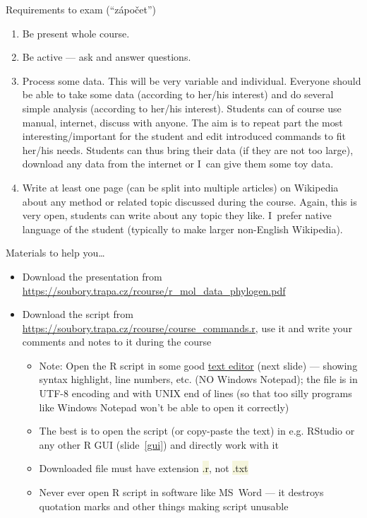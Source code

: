 \documentclass[compress, ucs, xelatex, 11pt, xcolor=svgnames, aspectratio=169,
	hyperref={
		bookmarks=true,
		unicode=true,
		colorlinks=true,
		pdftitle={Molecular data in R},
		plainpages=false,
		pdfauthor={Vojtech Zeisek},
		pdfsubject={Course about phylogeny and evolution in R},
		pdfcreator={XeLaTeX},
		pdfkeywords={R, evolution, phylogeny, molecular data},
		linkcolor=Crimson, %
		anchorcolor=Magenta, %
		citecolor=Magenta, %
		filecolor=Magenta, %
		menucolor=Magenta, %
		urlcolor=DodgerBlue, %
		pdftex},
	url={hyphens, lowtilde} %
	]{beamer}
\renewcommand{\texttt}[1]{\colorbox{Beige}{{\ttfamily #1}}}
\begin{document}
\begin{frame}{Requirements to exam (\enquote{zápočet})}
	\begin{enumerate}
		\item Be present whole course.
		\item Be active --- ask and answer questions.
		\item Process some data. This will be very variable and individual. Everyone should be able to take some data (according to her/his interest) and do several simple analysis (according to her/his interest). Students can of course use manual, internet, discuss with anyone. The aim is to repeat part the most interesting/important for the student and edit introduced commands to fit her/his needs. Students can thus bring their data (if they are not too large), download any data from the internet or I~can give them some toy data.
		\item Write at least one page (can be split into multiple articles) on Wikipedia about any method or related topic discussed during the course. Again, this is very open, students can write about any topic they like. I~prefer native language of the student (typically to make larger non-English Wikipedia).
	\end{enumerate}
\end{frame}

\begin{frame}{Materials to help you\ldots}
	\begin{itemize}
		\item Download the presentation from \url{https://soubory.trapa.cz/rcourse/r_mol_data_phylogen.pdf}
		\item Download the script from \url{https://soubory.trapa.cz/rcourse/course_commands.r}, use it and write your comments and notes to it during the course
		\begin{itemize}
			\item \alert{Note:} Open the R script in some \alert{good} \href{https://texteditors.org/cgi-bin/wiki.pl?PickingATextEditor}{text editor} (next slide) --- showing syntax highlight, line numbers, etc. (\alert{NO} Windows Notepad); the file is in UTF-8 encoding and with UNIX end of lines (so that too silly programs like Windows Notepad won't be able to open it correctly)
			\item The best is to open the script (or copy-paste the text) in e.g. RStudio or any other R GUI (slide~\ref{gui}) and directly work with it
			\item \alert{Downloaded file must have extension \texttt{*.r}, not \texttt{*.txt}}
			\item \alert{Never ever} open R script in software like MS~Word --- it destroys quotation marks and other things making script unusable
		\end{itemize}
	\end{itemize}
\end{frame}
\end{document}
